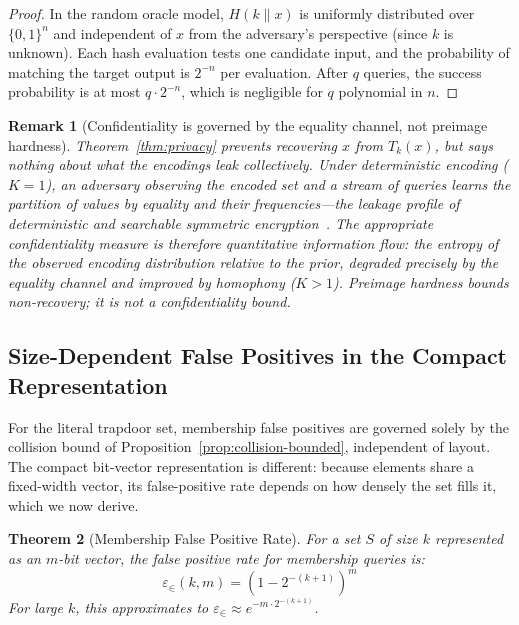 \documentclass[10pt,conference]{IEEEtran}
\newtheorem{theorem}{Theorem}
\newtheorem{remark}[theorem]{Remark}
\begin{document}
\begin{proof}
In the random oracle model, $H(k \| x)$ is uniformly distributed over $\{0,1\}^n$ and independent of $x$ from the adversary's perspective (since $k$ is unknown). Each hash evaluation tests one candidate input, and the probability of matching the target output is $2^{-n}$ per evaluation. After $q$ queries, the success probability is at most $q \cdot 2^{-n}$, which is negligible for $q$ polynomial in $n$.
\end{proof}

\begin{remark}[Confidentiality is governed by the equality channel, not preimage hardness]
\label{rem:qif}
Theorem~\ref{thm:privacy} prevents recovering $x$ from $T_k(x)$, but says nothing about what the encodings leak \emph{collectively}. Under deterministic encoding ($K = 1$), an adversary observing the encoded set and a stream of queries learns the partition of values by equality and their frequencies---the leakage profile of deterministic and searchable symmetric encryption~\cite{curtmola2006searchable}. The appropriate confidentiality measure is therefore quantitative information flow: the entropy of the observed encoding distribution relative to the prior, degraded precisely by the equality channel and improved by homophony ($K > 1$). Preimage hardness bounds non-recovery; it is not a confidentiality bound.
\end{remark}

\subsection{Size-Dependent False Positives in the Compact Representation}
\label{sec:fpr-analysis}

For the literal trapdoor set, membership false positives are governed solely by the collision bound of Proposition~\ref{prop:collision-bounded}, independent of layout. The compact bit-vector representation is different: because elements share a fixed-width vector, its false-positive rate depends on how densely the set fills it, which we now derive.

\begin{theorem}[Membership False Positive Rate]
\label{thm:membership-fpr}
For a set $S$ of size $k$ represented as an $m$-bit vector, the false positive rate for membership queries is:
$$\varepsilon_{\in}(k,m) = \left(1 - 2^{-(k+1)}\right)^m$$
For large $k$, this approximates to $\varepsilon_{\in} \approx e^{-m \cdot 2^{-(k+1)}}$.
\end{theorem}
\end{document}
